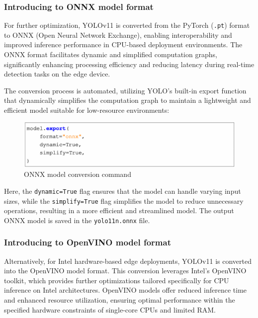 \subsubsection{Introducing to ONNX model format}

For further optimization, YOLOv11 is converted from the PyTorch (\texttt{.pt}) format to ONNX (Open Neural Network Exchange), enabling interoperability and improved inference performance in CPU-based deployment environments. The ONNX format facilitates dynamic and simplified computation graphs, significantly enhancing processing efficiency and reducing latency during real-time detection tasks on the edge device.

The conversion process is automated, utilizing YOLO's built-in export function that dynamically simplifies the computation graph to maintain a lightweight and efficient model suitable for low-resource environments:

\begin{figure}[htbp]
    \centering
    \includegraphics[width=1\textwidth]{Figure/onnx_command.png}
    \caption{ONNX model conversion command}
    \label{fig:onnx_command}
\end{figure}

Here, the \texttt{dynamic=True} flag ensures that the model can handle varying input sizes, while the \texttt{simplify=True} flag simplifies the model to reduce unnecessary operations, resulting in a more efficient and streamlined model. The output ONNX model is saved in the \texttt{yolo11n.onnx} file.


\subsubsection{Introducing to OpenVINO model format}

Alternatively, for Intel hardware-based edge deployments, YOLOv11 is converted into the OpenVINO model format. This conversion leverages Intel's OpenVINO toolkit, which provides further optimizations tailored specifically for CPU inference on Intel architectures. OpenVINO models offer reduced inference time and enhanced resource utilization, ensuring optimal performance within the specified hardware constraints of single-core CPUs and limited RAM.

